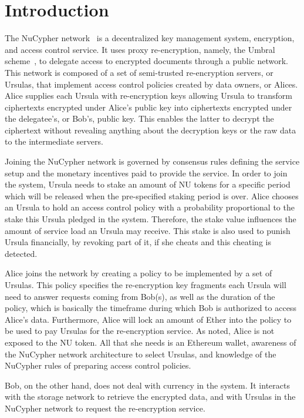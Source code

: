 \section{Introduction}
\label{intro}
The NuCypher network~\cite{egorov2017nucypher} is a decentralized key management 
system, encryption, and access control service. It uses proxy re-encryption, namely, the 
Umbral scheme~\cite{umbral2018}, to delegate access to encrypted 
documents through a public network. This network is composed of a set of semi-trusted 
re-encryption servers, or Ursulas, that implement access control policies created by data 
owners, or Alices. Alice supplies each Ursula with re-encryption keys allowing Ursula to transform 
ciphertexts encrypted under Alice's public key into ciphertexts encrypted under the delegatee's, or Bob's,
public key. This enables the latter to decrypt the ciphertext without revealing anything about the
decryption keys or the raw data to the intermediate servers.


Joining the NuCypher network is governed by consensus rules defining the service setup
and the monetary incentives paid to provide the service. In order to join the 
system, Ursula needs to stake an amount of NU tokens for a specific period
which will be released when the pre-specified staking period is over. Alice chooses an
Ursula to hold an access control policy with a probability proportional to the stake this Ursula 
pledged in the system. Therefore, the stake value influences the amount of service load an Ursula
may receive. This stake is also used to punish Ursula financially, by revoking part 
of it, if she cheats and this cheating is detected. 


Alice joins the network by creating a policy to be implemented by a 
set of Ursulas. This policy specifies the re-encryption key fragments each Ursula will
need to answer requests coming from Bob(s), as well as the duration of the policy, which 
is basically the timeframe during which Bob is authorized to access Alice's data.  Furthermore,
Alice will lock an amount of Ether into the policy to be used to pay Ursulas for the re-encryption 
service. As noted, Alice is not exposed to the NU token. All that she needs is an Ethereum
wallet, awareness of the NuCypher network architecture to select Ursulas, and knowledge of the
NuCypher rules of preparing access control policies.


Bob, on the other hand, does not deal with currency in the system. It interacts with the storage 
network to retrieve the encrypted data, and with Ursulas in the NuCypher network to request the
re-encryption service.


